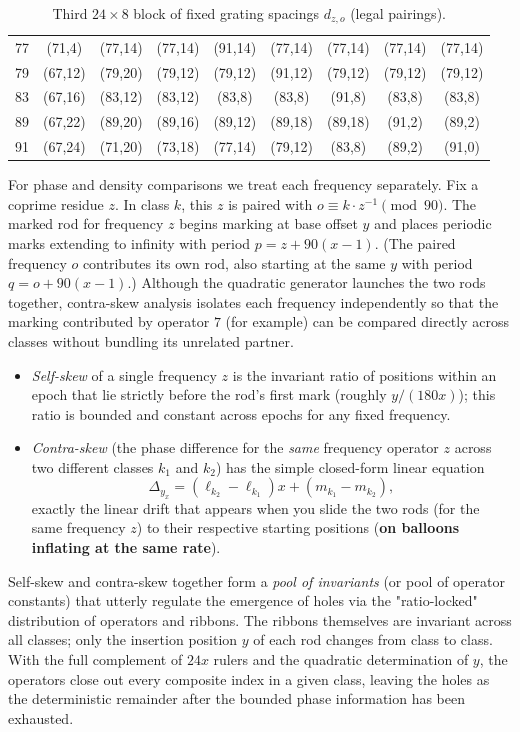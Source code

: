 \documentclass[11pt,a4paper]{article}
\begin{document}
\begin{table}[htbp]
\begin{tabular}{c|cccccccc}
77 & (71,4) & (77,14) & (77,14) & (91,14) & (77,14) & (77,14) & (77,14) & (77,14) \\
79 & (67,12) & (79,20) & (79,12) & (79,12) & (91,12) & (79,12) & (79,12) & (79,12) \\
83 & (67,16) & (83,12) & (83,12) & (83,8) & (83,8) & (91,8) & (83,8) & (83,8) \\
89 & (67,22) & (89,20) & (89,16) & (89,12) & (89,18) & (89,18) & (91,2) & (89,2) \\
91 & (67,24) & (71,20) & (73,18) & (77,14) & (79,12) & (83,8) & (89,2) & (91,0) \\
\end{tabular}
\caption{Third \(24 \times 8\) block of fixed grating spacings \(d_{z,o}\) (legal pairings).}
\label{tab:d-block3}
\end{table}

For phase and density comparisons we treat each frequency separately. Fix a coprime residue \(z\). In class \(k\), this \(z\) is paired with \(o\equiv k\cdot z^{-1}\pmod{90}\). The marked rod for frequency \(z\) begins marking at base offset \(y\) and places periodic marks extending to infinity with period \(p=z+90(x-1)\). (The paired frequency \(o\) contributes its own rod, also starting at the same \(y\) with period \(q=o+90(x-1)\).) Although the quadratic generator launches the two rods together, contra-skew analysis isolates each frequency independently so that the marking contributed by operator \(7\) (for example) can be compared directly across classes without bundling its unrelated partner.



\begin{itemize}
\item \emph{Self-skew} of a single frequency \(z\) is the invariant ratio of positions within an epoch that lie strictly before the rod’s first mark (roughly \(y/(180x)\)); this ratio is bounded and constant across epochs for any fixed frequency.
\item \emph{Contra-skew} (the phase difference for the \emph{same} frequency operator \(z\) across two different classes \(k_1\) and \(k_2\)) has the simple closed-form linear equation
\[
\Delta_{y_x}=(\ell_{k_2}-\ell_{k_1})x+(m_{k_1}-m_{k_2}),
\]
exactly the linear drift that appears when you slide the two rods (for the same frequency \(z\)) to their respective starting positions (\textbf{on balloons inflating at the same rate}).
\end{itemize}

Self-skew and contra-skew together form a \emph{pool of invariants} (or pool of operator constants) that utterly regulate the emergence of holes via the "ratio-locked" distribution of operators and ribbons. The ribbons themselves are invariant across all classes; only the insertion position \(y\) of each rod changes from class to class. With the full complement of \(24x\) rulers and the quadratic determination of \(y\), the operators close out every composite index in a given class, leaving the holes as the deterministic remainder after the bounded phase information has been exhausted.
\end{document}
